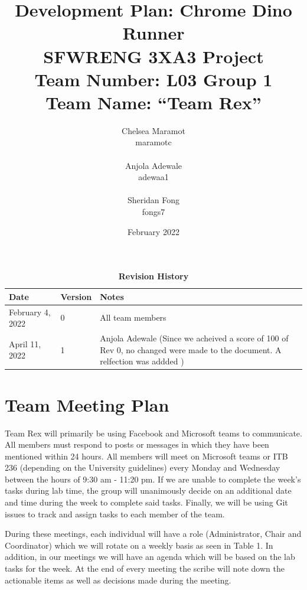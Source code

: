 \documentclass{article}
\title{Development Plan: Chrome Dino Runner \\ \bigskip \large SFWRENG 3XA3 Project \\ \bigskip \large Team Number: L03 Group 1 \\ \large Team Name: ``Team Rex'' }
\author{Chelsea Maramot \\ maramotc \\ \\ Anjola Adewale \\ adewaa1 \\ \\ Sheridan Fong \\ fongs7 }
\date{February 2022}
\begin{document}
\maketitle
	
\newpage

\begin{table}[h]
\caption{\bf Revision History}
\begin{tabularx}{\textwidth}{p{3cm}p{2cm}X}
    \toprule {\bf Date} & {\bf Version} & {\bf Notes}\\
    \midrule
    February 4, 2022 & 0 & All team members\\
    \midrule
    April 11, 2022 & 1 & Anjola Adewale (Since we acheived a score of 100 of Rev 0, no changed were made to the document. A relfection was addded )\\
    \bottomrule
    
\end{tabularx}
\end{table}


	
	
	\section{Team Meeting Plan}
	
   Team Rex will primarily be using Facebook and Microsoft teams to communicate.
   All members must respond to posts or messages in which they have been mentioned within 24 hours. 
   All members will meet on Microsoft teams or ITB 236 (depending on the University guidelines) every Monday and Wednesday between the hours of 9:30 am - 11:20 pm. 
   If we are unable to complete the week’s tasks during lab time, the group will unanimously decide on an additional date and time during the week to complete said tasks.
   Finally, we will be using Git issues to track and assign tasks to each member of the team.
   
During these meetings, each individual will have a role (Administrator, Chair and Coordinator) which we will rotate on a weekly basis as seen in Table 1. 
In addition, in our meetings we will have an agenda which will be based on the lab tasks for the week. 
At the end of every meeting the scribe will note down the actionable items as well as decisions made during the meeting.
\end{document}
